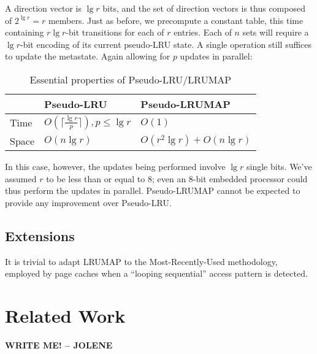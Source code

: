 \documentclass[10pt]{sigplanconf}
\begin{document}
A direction vector is $\lg{r}$ bits, and the set of direction vectors is thus
composed of $2^{\lg{r}}=r$ members. Just as before, we precompute a constant
table, this time containing $r \lg{r}$-bit transitions for each of $r$
entries. Each of $n$ sets will require a $\lg{r}$-bit encoding of its current
pseudo-LRU state. A single operation still suffices to update the metastate.
Again allowing for $p$ updates in parallel:
\begin{table}
\begin{center}
	\begin{tabular}{|l|l|l|}
	\hline
	& Pseudo-LRU & Pseudo-LRUMAP \\
	\hline
	Time & $O(\lceil\frac{\lg{r}}{p}\rceil), {p}\le{\lg{r}}$ & $O(1)$ \\
	\hline
	Space & $O(n\lg{r})$ & $O(r^{2}\lg{r}) + O(n\lg{r})$ \\
	\hline
	\end{tabular}
	\caption{Essential properties of Pseudo-LRU/LRUMAP}
\label{tab:pseudolru}
\end{center}
\end{table}
In this case, however, the updates being performed involve $\lg{r}$ single bits.
We've assumed $r$ to be less than or equal to 8; even an 8-bit embedded processor
could thus perform the updates in parallel. Pseudo-LRUMAP cannot be expected to
provide any improvement over Pseudo-LRU.
\subsection{Extensions}
It is trivial to adapt LRUMAP to the Most-Recently-Used methodology, employed
by page caches when a ``looping sequential''\citep{dewitt} access pattern is
detected.
\section{Related Work}
\textbf{WRITE ME! -- JOLENE}


\end{document}
